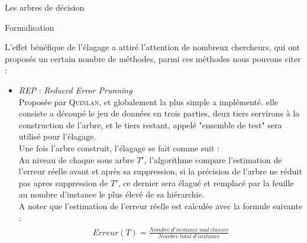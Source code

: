 \documentclass[a4paper, 11pt]{report}
\begin{document}
\begin{chapter}{Les arbres de décision}
\begin{paragraph}{Formalisation}
\end{paragraph}
L'effet bénéfique de l'élagage a attiré l'attention de nombreux chercheurs, qui ont proposés un certain nombre de méthodes\cite{esposito1997comparative}, parmi ces méthodes nous pouvons citer : \\
\begin{itemize}
\item \emph{REP} : \emph{Reduced Error Prunning}\\
Proposée par \textsc{Quinlan}, et globalement la plus simple a implémenté\cite{quinlan1987simplifying}. elle consiste a découpé le jeu de données en trois parties, deux tiers servirons à la construction de l'arbre, et le tiers restant, appelé "ensemble de test" sera utilisé pour l'élagage.\\
Une fois l'arbre construit, l'élagage se fait comme suit :\\
Au niveau de chaque sous arbre $T'$, l'algorithme compare l'estimation de l'erreur réelle avant et après sa suppression, si la précision de l'arbre ne réduit pas apres suppression de $T'$, ce dernier sera élagué et remplacé par la feuille au nombre d'instance le plus élevé de sa hiérarchie.\\
A noter que l'estimation de l'erreur réelle est calculée avec la formule suivante : \\
\begin{align}
\begin{split}\label{formule:InfoSplit}
Erreur(T) = \frac{Nombre\ d'instance\ mal\ classer}{Nombre\ total\ d'instance}
\end{split}
\end{align}
\end{itemize}







\end{chapter}
\end{document}
